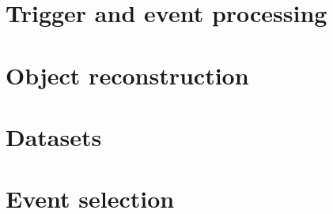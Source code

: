 \section{Trigger and event processing}
\section{Object reconstruction}
\section{Datasets}
\section{Event selection}